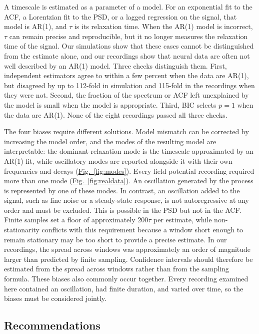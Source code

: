 \documentclass[pdflatex,sn-mathphys-num]{sn-jnl}
\newcommand{\figpanel}[2]{\hyperref[#1]{Fig.~\ref*{#1}#2}}
\begin{document}
A timescale is estimated as a parameter of a model. For an exponential fit to the ACF, a Lorentzian fit to the PSD, or a lagged regression on the signal, that model is AR(1), and $\tau$ is its relaxation time. When the AR(1) model is incorrect, $\tau$ can remain precise and reproducible, but it no longer measures the relaxation time of the signal. Our simulations show that these cases cannot be distinguished from the estimate alone, and our recordings show that neural data are often not well described by an AR(1) model. Three checks distinguish them. First, independent estimators agree to within a few percent when the data are AR(1), but disagreed by up to 112-fold in simulation and 115-fold in the recordings when they were not. Second, the fraction of the spectrum or ACF left unexplained by the model is small when the model is appropriate. Third, BIC selects $p = 1$ when the data are AR(1). None of the eight recordings passed all three checks.

The four biases require different solutions. Model mismatch can be corrected by increasing the model order, and the modes of the resulting model are interpretable: the dominant relaxation mode is the timescale approximated by an AR(1) fit, while oscillatory modes are reported alongside it with their own frequencies and decays (\figpanel{fig:modes}{}). Every field-potential recording required more than one mode (\figpanel{fig:realdata}{}). An oscillation generated by the process is represented by one of these modes. In contrast, an oscillation added to the signal, such as line noise or a steady-state response, is not autoregressive at any order and must be excluded. This is possible in the PSD but not in the ACF. Finite samples set a floor of approximately $200\tau$ per estimate, while non-stationarity conflicts with this requirement because a window short enough to remain stationary may be too short to provide a precise estimate. In our recordings, the spread across windows was approximately an order of magnitude larger than predicted by finite sampling. Confidence intervals should therefore be estimated from the spread across windows rather than from the sampling formula. These biases also commonly occur together. Every recording examined here contained an oscillation, had finite duration, and varied over time, so the biases must be considered jointly.

\subsection{Recommendations}
\end{document}
